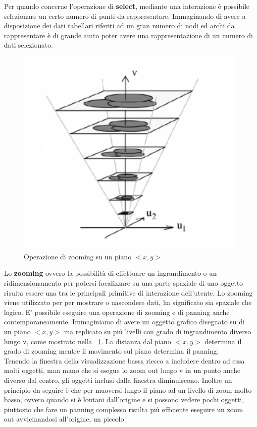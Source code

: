 {Per quando concerne l'operazione di \textbf{select}, mediante una interazione è possibile selezionare un certo numero di punti da rappresentare. Immaginando di avere a disposizione dei dati tabellari riferiti ad un gran numero di nodi ed archi da rappresentare è di grande aiuto poter avere una rappresentazione di un numero di dati selezionato.
\begin{figure}[!htb]
	\begin{center}
		\includegraphics[width=0.7 \linewidth]{figure/zooming}
	\end{center}
	\caption{Operazione di zooming su un piano $<x,y>$\label{fig:zooming}}
\end{figure}
Lo \textbf{zooming} ovvero la possibilità di effettuare un ingrandimento o un ridimensionamento per potersi focalizzare su una parte spaziale di uno oggetto risulta essere una tra le principali primitive di interazione dell'utente. Lo zooming viene utilizzato per per mostrare o nascondere dati, ha significato sia spaziale che logico. E’ possibile eseguire una operazione di zooming e di panning anche contemporaneamente. Immaginiamo di avere un oggetto grafico disegnato su di un piano $<x,y>$ ma replicato su più livelli con grado di ingrandimento diverso lungo v, come mostrato nella \figurename~\ref{fig:zooming}. La distanza dal piano $<x,y>$ determina il grado di zooming mentre il movimento sul piano determina il panning.\\
Tenendo la finestra della visualizzazione bassa riesco a includere dentro ad essa molti oggetti, man mano che si esegue lo zoom out lungo v in un punto anche diverso dal centro, gli oggetti inclusi dalla finestra diminuiscono.
Inoltre un principio da seguire è che per muoversi lungo il piano ad un livello di zoom molto basso, ovvero quando si è lontani dall'origine e si possono vedere pochi oggetti, piuttosto che fare un panning complesso risulta più efficiente eseguire un zoom out avvicinandosi all’origine, un piccolo
}
